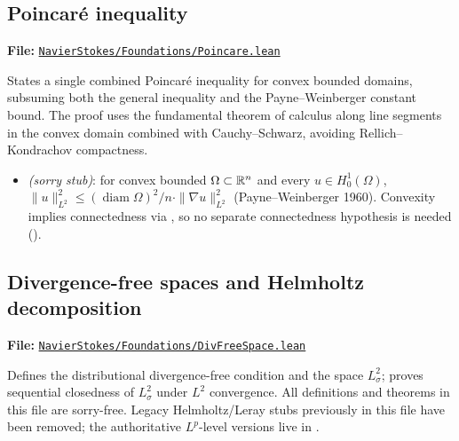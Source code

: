 \subsection{Poincar\'{e} inequality}\label{sec:lean-ch1-poincare}

\textbf{File:}
\href{https://github.com/alejandro-soto-franco/navier-stokes/blob/master/lean/NavierStokes/Foundations/Poincare.lean}%
{\texttt{NavierStokes/Foundations/Poincare.lean}}

\medskip\noindent
States a single combined Poincar\'{e} inequality for convex bounded domains,
subsuming both the general inequality and the Payne--Weinberger constant bound.
The proof uses the fundamental theorem of calculus along line segments in the
convex domain combined with Cauchy--Schwarz, avoiding Rellich--Kondrachov
compactness.

\begin{itemize}
  \item {}
    \emph{(\textit{sorry} stub)}: for convex bounded $\Omega \subset \mathbb{R}^{n}$
    and every $u \in H^{1}_{0}(\Omega)$,
    $\|u\|_{L^{2}}^{2} \le (\operatorname{diam}\Omega)^{2}/n \cdot
    \|\nabla u\|_{L^{2}}^{2}$
    (Payne--Weinberger 1960).  Convexity implies connectedness via
    , so no separate connectedness hypothesis is
    needed ().
\end{itemize}

\subsection{Divergence-free spaces and Helmholtz decomposition}%
\label{sec:lean-ch1-divfree}

\textbf{File:}
\href{https://github.com/alejandro-soto-franco/navier-stokes/blob/master/lean/NavierStokes/Foundations/DivFreeSpace.lean}%
{\texttt{NavierStokes/Foundations/DivFreeSpace.lean}}

\medskip\noindent
Defines the distributional divergence-free condition and the space
$L^{2}_{\sigma}$; proves sequential closedness of $L^{2}_{\sigma}$ under
$L^{2}$ convergence.  All definitions and theorems in this file are sorry-free.
Legacy Helmholtz/Leray stubs previously in this file have been removed; the
authoritative $L^{p}$-level versions live in
.

